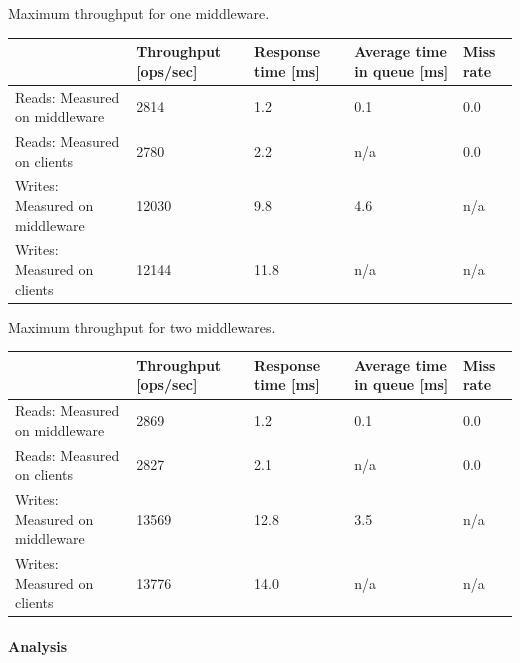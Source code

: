\documentclass[report.tex]{subfiles}
\begin{document}
\begin{center}
	{Maximum throughput for one middleware.}
	\begin{tabular}{|l|p{2cm}|p{2cm}|p{2cm}|p{2cm}|}
		\hline                                & Throughput [ops/sec] & Response time [ms] & Average time in queue [ms] & Miss rate \\ 
		\hline Reads: Measured on middleware  &                 2814 &                1.2 &                        0.1 & 0.0       \\ 
		\hline Reads: Measured on clients     &                 2780 &                2.2 &                        n/a & 0.0       \\ 
		\hline Writes: Measured on middleware &                12030 &                9.8 &                        4.6 & n/a       \\ 
		\hline Writes: Measured on clients    &                12144 &                11.8 &                       n/a & n/a       \\ 
		\hline 
	\end{tabular}
\end{center}

\begin{center}
	{Maximum throughput for two middlewares.}
	\begin{tabular}{|l|p{2cm}|p{2cm}|p{2cm}|p{2cm}|}
		\hline                                & Throughput [ops/sec] & Response time [ms] & Average time in queue [ms] & Miss rate \\ 
		\hline Reads: Measured on middleware  &                 2869 &                1.2 &                        0.1 & 0.0       \\ 
		\hline Reads: Measured on clients     &                 2827 &                2.1 &                        n/a & 0.0       \\ 
		\hline Writes: Measured on middleware &                13569 &               12.8 &                        3.5 & n/a       \\ 
		\hline Writes: Measured on clients    &                13776 &               14.0 &                        n/a & n/a       \\ 
		\hline 
	\end{tabular}
\end{center}


\paragraph{Analysis}
\end{document}
